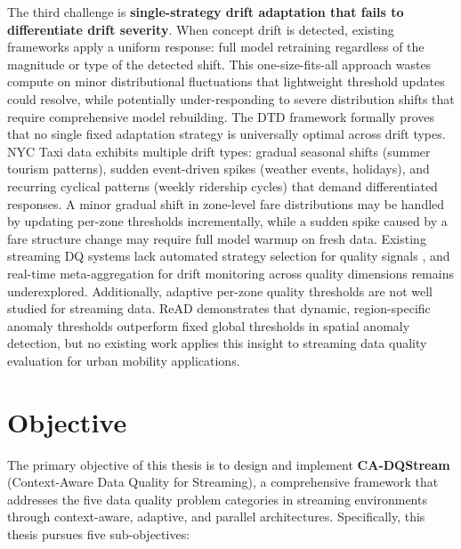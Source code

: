 The third challenge is \textbf{single-strategy drift adaptation that fails to differentiate drift severity}. When concept drift is detected, existing frameworks apply a uniform response: full model retraining regardless of the magnitude or type of the detected shift. This one-size-fits-all approach wastes compute on minor distributional fluctuations that lightweight threshold updates could resolve, while potentially under-responding to severe distribution shifts that require comprehensive model rebuilding. The DTD framework \cite{dtd2026} formally proves that no single fixed adaptation strategy is universally optimal across drift types. NYC Taxi data exhibits multiple drift types: gradual seasonal shifts (summer tourism patterns), sudden event-driven spikes (weather events, holidays), and recurring cyclical patterns (weekly ridership cycles) that demand differentiated responses. A minor gradual shift in zone-level fare distributions may be handled by updating per-zone thresholds incrementally, while a sudden spike caused by a fare structure change may require full model warmup on fresh data. Existing streaming DQ systems lack automated strategy selection for quality signals \cite{contextdq2022}, and real-time meta-aggregation for drift monitoring across quality dimensions remains underexplored. Additionally, adaptive per-zone quality thresholds are not well studied for streaming data. ReAD \cite{read2020} demonstrates that dynamic, region-specific anomaly thresholds outperform fixed global thresholds in spatial anomaly detection, but no existing work applies this insight to streaming data quality evaluation for urban mobility applications.

\section{Objective}
The primary objective of this thesis is to design and implement \textbf{CA-DQStream} (Context-Aware Data Quality for Streaming), a comprehensive framework that addresses the five data quality problem categories in streaming environments through context-aware, adaptive, and parallel architectures. Specifically, this thesis pursues five sub-objectives:

